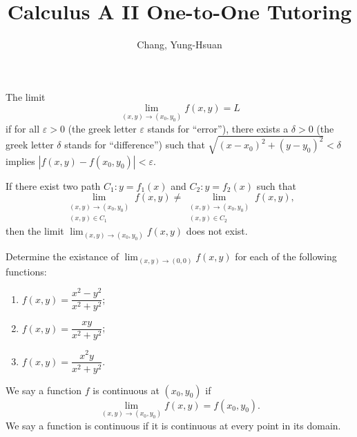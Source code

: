 \documentclass[11pt]{article}
\title{\textbf{Calculus A II One-to-One Tutoring}}
\author{Chang, Yung-Hsuan}
\theoremstyle{break}
\numberwithin{equation}{theorem}
\begin{document}
\maketitle

\begin{definition}[Limit]
    The limit $$\lim_{(x, y)\to(x_0, y_0)}f(x, y)=L$$ if for all $\varepsilon>0$ (the greek letter $\varepsilon$ stands for ``error''), there exists a $\delta>0$ (the greek letter $\delta$ stands for ``difference'') such that $\sqrt{(x-x_0)^2+(y-y_0)^2}<\delta$ implies $|f(x, y)-f(x_0, y_0)|<\varepsilon$.
\end{definition}

\begin{remark}
    If there exist two path $C_1: y=f_1(x)$ and $C_2: y=f_2(x)$ such that $$\lim_{\substack{(x, y)\to(x_0, y_0)\\(x, y)\in C_1}}f(x, y)\ne\lim_{\substack{(x, y)\to(x_0, y_0)\\(x, y)\in C_2}}f(x, y),$$ then the limit $\displaystyle\lim_{(x, y)\to(x_0, y_0)}f(x, y)$ does not exist.
\end{remark}

\begin{example}
    Determine the existance of $\displaystyle\lim_{(x, y)\to(0, 0)}f(x, y)$ for each of the following functions:
    \begin{enumerate}
        \item $f(x, y)=\dfrac{x^2-y^2}{x^2+y^2}$;
        \item $f(x, y)=\dfrac{xy}{x^2+y^2}$;
        \item $f(x, y)=\dfrac{x^2y}{x^2+y^2}$.
    \end{enumerate}
\end{example}

\begin{definition}[Continuity]
    We say a function $f$ is continuous at $(x_0, y_0)$ if $$\lim_{(x, y)\to(x_0, y_0)}f(x, y)=f(x_0, y_0).$$ We say a function is continuous if it is continuous at every point in its domain.
\end{definition}
\end{document}
